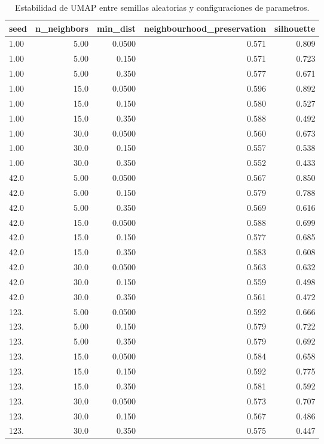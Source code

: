 \begin{table}[htbp]
\centering
\small
\caption{Estabilidad de UMAP entre semillas aleatorias y configuraciones de parametros.}
\label{tab:umap-stability-es}
\begin{tabular}{lrrrr}
\toprule
\textbf{seed} & \textbf{n\_neighbors} & \textbf{min\_dist} & \textbf{neighbourhood\_preservation} & \textbf{silhouette} \\
\midrule
1.00 & 5.00 & 0.0500 & 0.571 & 0.809 \\
1.00 & 5.00 & 0.150 & 0.571 & 0.723 \\
1.00 & 5.00 & 0.350 & 0.577 & 0.671 \\
1.00 & 15.0 & 0.0500 & 0.596 & 0.892 \\
1.00 & 15.0 & 0.150 & 0.580 & 0.527 \\
1.00 & 15.0 & 0.350 & 0.588 & 0.492 \\
1.00 & 30.0 & 0.0500 & 0.560 & 0.673 \\
1.00 & 30.0 & 0.150 & 0.557 & 0.538 \\
1.00 & 30.0 & 0.350 & 0.552 & 0.433 \\
42.0 & 5.00 & 0.0500 & 0.567 & 0.850 \\
42.0 & 5.00 & 0.150 & 0.579 & 0.788 \\
42.0 & 5.00 & 0.350 & 0.569 & 0.616 \\
42.0 & 15.0 & 0.0500 & 0.588 & 0.699 \\
42.0 & 15.0 & 0.150 & 0.577 & 0.685 \\
42.0 & 15.0 & 0.350 & 0.583 & 0.608 \\
42.0 & 30.0 & 0.0500 & 0.563 & 0.632 \\
42.0 & 30.0 & 0.150 & 0.559 & 0.498 \\
42.0 & 30.0 & 0.350 & 0.561 & 0.472 \\
123. & 5.00 & 0.0500 & 0.592 & 0.666 \\
123. & 5.00 & 0.150 & 0.579 & 0.722 \\
123. & 5.00 & 0.350 & 0.579 & 0.692 \\
123. & 15.0 & 0.0500 & 0.584 & 0.658 \\
123. & 15.0 & 0.150 & 0.592 & 0.775 \\
123. & 15.0 & 0.350 & 0.581 & 0.592 \\
123. & 30.0 & 0.0500 & 0.573 & 0.707 \\
123. & 30.0 & 0.150 & 0.567 & 0.486 \\
123. & 30.0 & 0.350 & 0.575 & 0.447 \\

\end{tabular}
\end{table}
